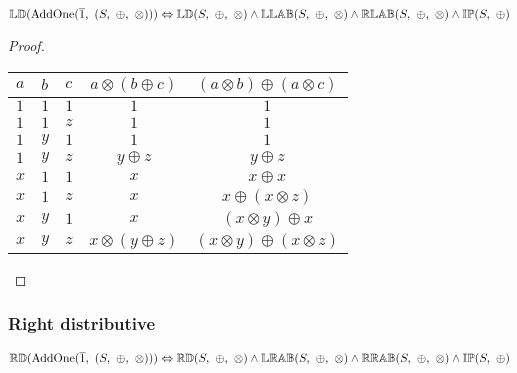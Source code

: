 \documentclass[10pt, ../Summary.tex]{subfiles}
\begin{document}
\begin{theorem} \label{thm:addone_left_distributive}
$\propname{LD}(\mathrm{AddOne}(\overline{1},\ (S,\ \oplus,\ \otimes))) \Leftrightarrow \propname{LD}(S,\ \oplus,\ \otimes) \wedge \propname{LLAB}(S,\ \oplus,\ \otimes) \wedge \propname{RLAB}(S,\ \oplus,\ \otimes) \wedge \propname{IP}(S,\ \oplus) $
\end{theorem}

\begin{proof}
\begin{center}
\begin{tabular}{lllcc}
\toprule
$a$ & $b$ & $c$ & $a \otimes (b \oplus c)$ & $(a \otimes b) \oplus (a \otimes c)$ \\
\midrule
$1$ & $1$ & $1$ & $1$ 						& $1$ \\
$1$ & $1$ & $z$ & $1$						& $1$ \\
$1$ & $y$ & $1$ & $1$						& $1$ \\
$1$ & $y$ & $z$ & $y \oplus z$				& $y \oplus z$ \\
$x$ & $1$ & $1$ & $x$						& $x \oplus x$ \\
$x$ & $1$ & $z$ & $x$						& $x \oplus (x \otimes z)$ \\
$x$ & $y$ & $1$ & $x$						& $(x \otimes y) \oplus x$ \\
$x$ & $y$ & $z$ & $x \otimes (y \oplus z)$	& $(x \otimes y) \oplus (x \otimes z)$ \\
\bottomrule
\end{tabular}
\end{center}
\end{proof}




\subsubsection{Right distributive}

\begin{theorem} \label{thm:addone_right_distributive}
$\propname{RD}(\mathrm{AddOne}(\overline{1},\ (S,\ \oplus,\ \otimes))) \Leftrightarrow \propname{RD}(S,\ \oplus,\ \otimes) \wedge \propname{LRAB}(S,\ \oplus,\ \otimes) \wedge \propname{RRAB}(S,\ \oplus,\ \otimes) \wedge \propname{IP}(S,\ \oplus) $
\end{theorem}
\end{document}
